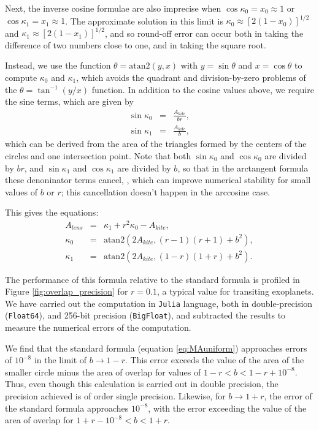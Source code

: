 \documentclass[modern]{aastex61}
\begin{document}
Next, the inverse cosine formulae are also imprecise when $\cos{\kappa_0} = x_0 \approx
1$ or $\cos{\kappa_1} = x_1 \approx 1$.  The approximate solution in this limit
is $\kappa_0 \approx [2(1-x_0)]^{1/2}$ and $\kappa_1 \approx [2(1-x_1)]^{1/2}$, and so round-off 
error can occur both in taking the difference of two numbers close to one,
and in taking the square root.

Instead, we use the function $\theta = \mathrm{atan2}(y,x)$ with $y=\sin{\theta}$ and
$x=\cos{\theta}$ to compute $\kappa_0$ and $\kappa_1$, which avoids the quadrant and
division-by-zero problems of the $\theta = \tan^{-1}(y/x)$ function.  In addition
to the cosine values above, we require the sine terms, which are given by
\begin{eqnarray}
\sin{\kappa_0} &=& \frac{A_{kite}}{br},\\
\sin{\kappa_1} &=& \frac{A_{kite}}{b},
\end{eqnarray}
which can be derived from the area of the triangles formed by the centers of
the circles and one intersection point.
Note that both $\sin{\kappa_0}$ and $\cos{\kappa_0}$ are divided by $br$, and
$\sin{\kappa_1}$ and $\cos{\kappa_1}$ are divided by $b$, so that
in the arctangent formula these denoninator terms cancel, , which can improve 
numerical stability for small values of $b$ or $r$; this cancellation doesn't happen
in the arccosine case.

This gives the equations:
\begin{eqnarray} \label{eq:area_of_overlap}
A_{lens} &=& \kappa_1 + r^2\kappa_0 - A_{kite},\\
\kappa_0 &=& \mathrm{atan2}(2A_{kite},(r-1)(r+1)+b^2),\\
\kappa_1 &=& \mathrm{atan2}(2A_{kite},(1-r)(1+r)+b^2).
\end{eqnarray}

The performance of this formula relative to the standard formula is profiled
in Figure \ref{fig:overlap_precision} for $r=0.1$, a typical
value for transiting exoplanets.  We have carried out
the computation in \texttt{Julia} language, both in double-precision
(\texttt{Float64}), and 256-bit precision (\texttt{BigFloat}), and
subtracted the results to measure the numerical errors of the computation.

We find that the standard
formula (equation \ref{eq:MAuniform}) approaches errors of $10^{-8}$
in the limit of $b \rightarrow 1-r$. This error exceeds the value
of the area of the smaller circle minus the area of overlap for
values of $1-r < b < 1-r+10^{-8}$.  Thus, even though this calculation
is carried out in double precision, the precision achieved is of
order single precision.  Likewise, for $b \rightarrow 1+r$,
the error of the standard formula approaches $10^{-8}$, with the
error exceeding the value of the area of overlap for $1+r-10^{-8} <
b < 1+r$.
\end{document}
